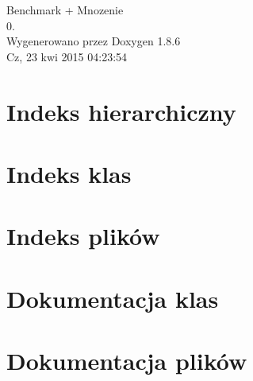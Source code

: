 \documentclass[twoside]{book}
\newcommand{\clearemptydoublepage}{%
  \newpage{\pagestyle{empty}\cleardoublepage}%
}
\begin{document}
\hypersetup{pageanchor=false}
\begin{titlepage}
\vspace*{7cm}
\begin{center}%
{\Large Benchmark + Mnozenie \\[1ex]\large 0. }\\
\vspace*{1cm}
{\large Wygenerowano przez Doxygen 1.8.6}\\
\vspace*{0.5cm}
{\small Cz, 23 kwi 2015 04:23:54}\\
\end{center}
\end{titlepage}
\clearemptydoublepage
\tableofcontents
\clearemptydoublepage
{}
\hypersetup{pageanchor=true}

\chapter{Indeks hierarchiczny}

\chapter{Indeks klas}

\chapter{Indeks plików}

\chapter{Dokumentacja klas}







\chapter{Dokumentacja plików}



























\newpage
{}
{}
\printindex
\end{document}
